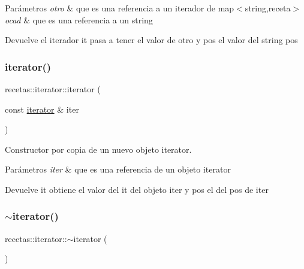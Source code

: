 \begin{DoxyParams}{Parámetros}
{\em otro} & que es una referencia a un iterador de map$<$string,receta$>$ \\
\hline
{\em ocad} & que es una referencia a un string \\
\hline
\end{DoxyParams}
\begin{DoxyReturn}{Devuelve}
el iterador it pasa a tener el valor de otro y pos el valor del string pos 
\end{DoxyReturn}
\mbox{\label{classrecetas_1_1iterator_a3598837a87526535f1d7b4f06e29edc3}} 
\subsubsection{\texorpdfstring{iterator()}{iterator()}\hspace{0.1cm}{\footnotesize\ttfamily [3/3]}}
{\footnotesize\ttfamily recetas\+::iterator\+::iterator (\begin{DoxyParamCaption}\item[{const \hyperlink{classrecetas_1_1iterator}{iterator} \&}]{iter }\end{DoxyParamCaption})\hspace{0.3cm}{\ttfamily [inline]}}



Constructor por copia de un nuevo objeto iterator. 


\begin{DoxyParams}{Parámetros}
{\em iter} & que es una referencia de un objeto iterator \\
\hline
\end{DoxyParams}
\begin{DoxyReturn}{Devuelve}
it obtiene el valor del it del objeto iter y pos el del pos de iter 
\end{DoxyReturn}
\mbox{\label{classrecetas_1_1iterator_a9789932f8c00bdb41360599cc442a920}} 
\subsubsection{\texorpdfstring{$\sim$iterator()}{~iterator()}}
{\footnotesize\ttfamily recetas\+::iterator\+::$\sim$iterator (\begin{DoxyParamCaption}{ }\end{DoxyParamCaption})\hspace{0.3cm}{\ttfamily [inline]}}



